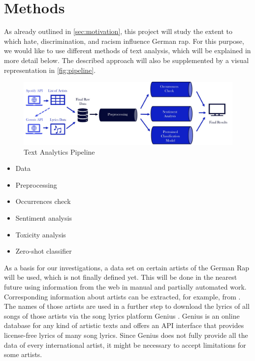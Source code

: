 \section{Methods}\label{sec:project}

As already outlined in \autoref{sec:motivation}, this project will study the extent to which hate, discrimination, and racism influence German rap. For this purpose, we would like to use different methods of text analysis, which will be explained in more detail below. The described approach will also be supplemented by a visual representation in \autoref{fig:pipeline}.

\begin{figure}[!htb]
  \centering
  \includegraphics[width=\textwidth]{figures/pipeline.jpg}
  \caption[]{Text Analytics Pipeline}
  \label{fig:pipeline}
  \end{figure}

  \begin{itemize}
    \item Data
    \item Preprocessing
    \item Occurrences check
    \item Sentiment analysis
    \item Toxicity analysis
    \item Zero-shot classifier
\end{itemize}

As a basis for our investigations, a data set on certain artists of the German Rap will be used, which is not finally defined yet. This will be done in the nearest future using information from the web in manual and partially automated work. Corresponding information about artists can be extracted, for example, from \cite{last.fm,tonspion_2021}. The names of those artists are used in a further step to download the lyrics of all songs of those artists via the song lyrics platform Genius \cite{genius}. Genius is an online database for any kind of artistic texts and offers an API interface that provides license-free lyrics of many song lyrics. Since Genius does not fully provide all the data of every international artist, it might be necessary to accept limitations for some artists.

